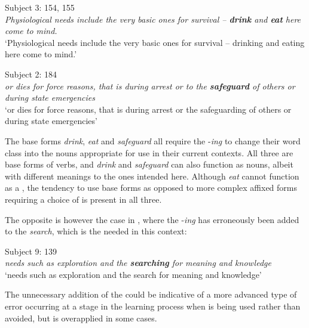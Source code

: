 \documentclass[output=paper]{langsci/langscibook}
\begin{document}
\begin{exe}  
  \ex{}
  {Subject 3: 154, 155}\\
    \textit{Physiological needs include the very basic ones for survival – \textbf{drink} and \textbf{eat} here come to mind.}\\
    {‘Physiological needs include the very basic ones for survival – drinking and eating here come to mind.’}
  \label{ex1}
\end{exe}

\begin{exe}  
  \ex{}
  {Subject 2: 184}\\
    \textit{or dies for force reasons, that is during arrest or to the \textbf{safeguard} of others or during state emergencies}\\
    {‘or dies for force reasons, that is during arrest or the safeguarding of others or during state emergencies’}
  \label{ex2}
\end{exe}


The base forms \textit{drink}, \textit{eat} and \textit{safeguard} all
require the  -\textit{ing} to change their word class into the
nouns appropriate for use in their current contexts. All three are
base forms of verbs, and \textit{drink} and \textit{safeguard} can
also function as nouns, albeit with different meanings to the ones
intended here. Although \textit{eat} cannot function as a , the
tendency to use base forms as opposed to more complex affixed forms
requiring a choice of  is present in all three.



The opposite is however the case in , where the  -\textit{ing} has erroneously been added to the  \textit{search}, which 
is the  needed in this context:


\begin{exe}  
  \ex{}
  {Subject 9: 139}\\
    \textit{needs such as exploration and the \textbf{searching} for meaning and knowledge}\\
    {‘needs such as exploration and the search for meaning and knowledge’}
  \label{ex3}
\end{exe}


The unnecessary addition of the  %
could be indicative of a
more advanced type of error occurring at a stage in the learning
process when  is being used rather than avoided, but is
overapplied in some cases.
\end{document}
